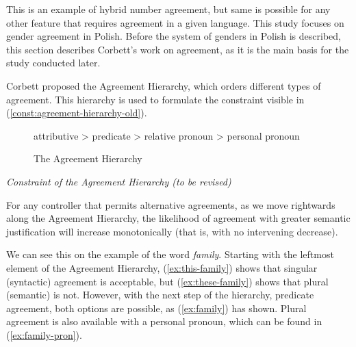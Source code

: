 \begin{exe}
  \ex\label{ex:family}
  \begin{xlist}
    \label{ex:family-have}
    \label{ex:family-has}
  \end{xlist}
\end{exe}

This is an example of hybrid number agreement, but same is possible for any other feature that requires agreement in a given language. This study focuses on gender agreement in Polish. Before the system of genders in Polish is described, this section describes Corbett's work on agreement, as it is the main basis for the study conducted later.

Corbett proposed the Agreement Hierarchy, which orders different types of agreement. This hierarchy is used to formulate the constraint visible in (\ref{const:agreement-hierarchy-old}).

\begin{figure}[H]
  \centering
  attributive > predicate > relative pronoun > personal pronoun
  \caption{The Agreement Hierarchy \citep{corbett_agreement_1979}}
  \label{fig:agreement-hierarchy}
\end{figure}

\begin{exe}
  \ex\label{const:agreement-hierarchy-old}
  \textit{Constraint of the Agreement Hierarchy (to be revised)}
  
  For any controller that permits alternative agreements, as we move rightwards along the Agreement Hierarchy, the likelihood of agreement with greater semantic justification will increase monotonically (that is, with no intervening decrease).
\end{exe}

We can see this on the example of the word \textsl{family}. Starting with the leftmost element of the Agreement Hierarchy, (\ref{ex:this-family}) shows that singular (syntactic) agreement is acceptable, but (\ref{ex:these-family}) shows that plural (semantic) is not. However, with the next step of the hierarchy, predicate agreement, both options are possible, as (\ref{ex:family}) has shown. Plural agreement is also available with a personal pronoun, which can be found in (\ref{ex:family-pron}).

\begin{exe}
  \begin{xlist}
    \label{ex:this-family}
    \label{ex:these-family}
  \end{xlist}
\end{exe}

